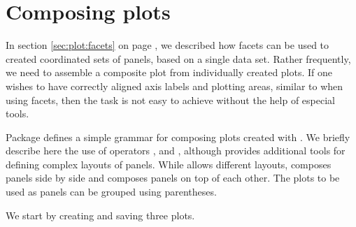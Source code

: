 \documentclass[krantz2]{krantz}\usepackage{knitr}
\begin{document}
\section{Composing plots}
In section \ref{sec:plot:facets} on page \pageref{sec:plot:facets}, we described how facets can be used to created coordinated sets of panels, based on a single data set. Rather frequently, we need to assemble a composite plot from individually created plots. If one wishes to have correctly aligned axis labels and plotting areas, similar to when using facets, then the task is not easy to achieve without the help of especial tools.

Package  defines a simple grammar for composing plots created with \ggplot. We briefly describe here the use of operators \Roperator{+}, \Roperator{|} and \Roperator{/}, although  provides additional tools for defining complex layouts of panels. While \Roperator{+} allows different layouts, \Roperator{|} composes panels side by side and \Roperator{/} composes panels on top of each other. The plots to be used as panels can be grouped using parentheses.

We start by creating and saving three plots.
\begin{knitrout}\footnotesize
{}\color{fgcolor}\begin{kframe}
\begin{alltt}
 \hlkwb{<-}    \hlstd{=}  \hlopt{+}
        \hlstd{()} \hlopt{+}
        \hlstd{(} \hlstd{=} \hlstd{)}
 \hlkwb{<-}    \hlstd{=}  \hlopt{+}
        \hlstd{()} \hlopt{+}
        \hlstd{(} \hlstd{=} \hlstd{)}
 \hlkwb{<-}  \hlstd{(} \hlopt{+}
        \hlstd{()} \hlopt{+}
        \hlstd{(} \hlstd{=}
                \hlstd{(} \hlstd{=} \hlstd{,}  \hlstd{=} \hlstd{,}  \hlstd{=} \hlstd{))}
\end{alltt}
\end{kframe}
\end{knitrout}
\end{document}
